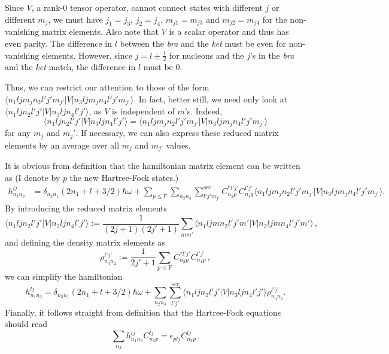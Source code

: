 \documentclass[11pt, oneside]{article}   	%
\begin{document}
Since $V$, a rank-0 tensor operator, cannot connect states with different $j$ or different $m_j$, we must have $j_1 = j_3$, $j_2 = j_4$, $m_{j1} = m_{j3}$ and $m_{j2} = m_{j4}$ for the non-vanishing matrix elements. Also note that $V$ is a scalar operator and thus has even parity. The difference in $l$ between the \textit{bra} and the \textit{ket} must be even for non-vanishing elements. However, since $j = l \pm \frac{1}{2}$ for nucleons and the $j$'s in the \textit{bra} and the \textit{ket} match, the difference in $l$ must be 0. 

Thus, we can restrict our attention to those of the form $\langle n_1ljm_jn_2l'j'm_{j'}|V|n_3ljm_jn_4l'j'm_{j'}\rangle$. In fact, better still, we need only look at $\langle n_1ljn_2l'j'|V|n_3ljn_4l'j'\rangle$, as $V$ is independent of $m$'s. Indeed, 
\begin{equation*}
\label{ }
\langle n_1ljn_2l'j'|V|n_3ljn_4l'j'\rangle = \langle n_1ljm_jn_2l'j'm_{j'}|V|n_3ljm_jn_4l'j'm_{j'}\rangle
\end{equation*} for any $m_j$ and $m_j'$. If necessary, we can also express these reduced matrix elements by an average over all $m_j$ and $m_{j'}$ values. 

It is obvious from definition that the hamiltonian matrix element can be written as (I denote by $p$ the new Hartree-Fock states.)
\begin{align*}
\label{ }
h^{lj}_{n_1n_3} &= \delta_{n_3 n_1}(2n_1+l + 3/2)\hbar\omega + \sum_{p \leq \mathrm{F}}\sum_{n_2n_4}\sum_{l'j'm_{j'}}^{occ} C^{*l'j'}_{n_2 p} C^{l'j'}_{n_4 q} \langle n_1ljm_jn_2l'j'm_{j'}|V|n_3ljm_jn_4l'j'm_{j'}\rangle.
\end{align*}
By introducing the reduced matrix elements
\begin{equation*}
\label{ }
\langle n_1ljn_2l'j'|V|n_3ljn_4l'j'\rangle := \frac{1}{(2j+1)(2j'+1)}\sum_{mm'}  \langle n_1ljmn_2l'j'm'|V|n_3ljmn_4l'j'm'\rangle\, ,
\end{equation*}
and defining the density matrix elements as
\begin{equation*}
\label{ }
\rho^{l'j'}_{n_4n_2} := \frac{1}{2j'+1} \sum_{p  \leq \mathrm{F}} C^{*l'j'}_{n_2p}C^{l'j'}_{n_4p}\,,
\end{equation*}
we can simplify the hamiltonian
\begin{equation*}
\label{ }
h^{lj}_{n_1n_3} = \delta_{n_3 n_1}(2n_1+l + 3/2)\hbar\omega + \sum_{n_2n_4}\sum_{l'j'}^{occ}\langle n_1ljn_2l'j'|V|n_3ljn_4l'j'\rangle\rho^{l'j'}_{n_4n_2}.
\end{equation*}
Fianally, it follows straight from definition that the Hartree-Fock equations should read
\begin{equation*}
\label{ }
\sum_{n_3} h^{lj}_{n_1n_3}C^{lj}_{n_3p} = \epsilon_{plj}C^{lj}_{n_3p}\,.
\end{equation*}
\end{document}
